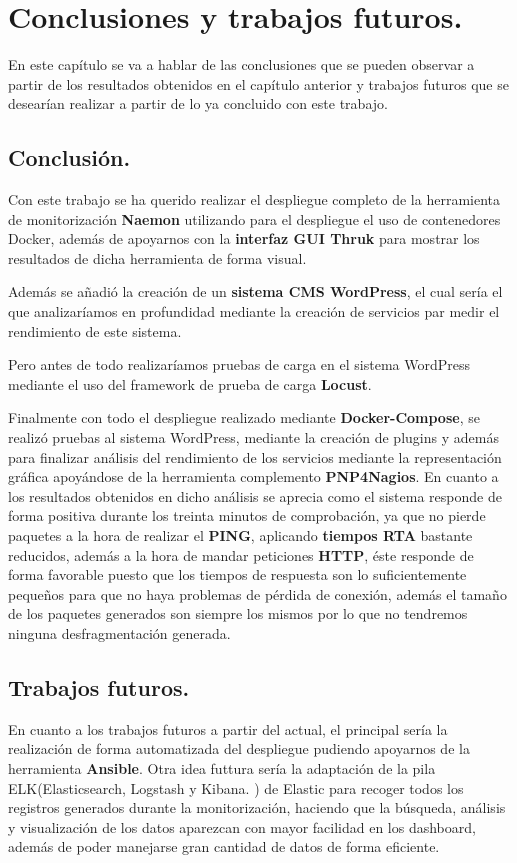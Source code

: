 \chapter{Conclusiones y trabajos futuros.} \label{ch:conclusion}

En este capítulo se va a hablar de las conclusiones que se pueden observar a partir de los resultados obtenidos en el capítulo anterior y trabajos futuros que se desearían realizar a partir de lo ya concluido con este trabajo.
\section{Conclusión.} \label{sec:resultado_final.}
Con este trabajo se ha querido realizar el despliegue completo de la herramienta de monitorización \textbf{Naemon} utilizando para el despliegue el uso de contenedores Docker, además de apoyarnos con la \textbf{interfaz GUI Thruk} para mostrar los resultados de dicha herramienta de forma visual.

Además se añadió la creación de un \textbf{sistema CMS WordPress}, el cual sería el que analizaríamos en profundidad mediante la creación de servicios par medir el rendimiento de este sistema.

Pero antes de todo realizaríamos pruebas de carga en el sistema WordPress mediante el uso del framework de prueba de carga \textbf{Locust}.

Finalmente con todo el despliegue realizado mediante \textbf{Docker-Compose}, se realizó pruebas al sistema WordPress, mediante la creación de plugins y además para finalizar análisis del rendimiento de los servicios mediante la representación gráfica apoyándose de la herramienta complemento \textbf{PNP4Nagios}.
\newpage
En cuanto a los resultados obtenidos en dicho análisis se aprecia como el sistema responde de forma positiva durante los treinta minutos de comprobación, ya que no pierde paquetes a la hora de realizar el \textbf{PING}, aplicando \textbf{tiempos RTA} bastante reducidos, además a la hora de mandar peticiones \textbf{HTTP}, éste responde de forma favorable puesto que los tiempos de respuesta son lo suficientemente pequeños para que no haya problemas de pérdida de conexión, además el tamaño de los paquetes generados son siempre los mismos por lo que no tendremos ninguna desfragmentación generada.

\section{Trabajos futuros.} \label{sec:trabajos_futuros.}

En cuanto a los trabajos futuros a partir del actual, el principal sería la realización de forma automatizada del despliegue pudiendo apoyarnos de la herramienta \textbf{Ansible}.
Otra idea futtura sería la adaptación de la pila ELK(Elasticsearch, Logstash y Kibana. ) de Elastic para recoger todos los registros generados durante la monitorización, haciendo que la búsqueda, análisis y visualización de los datos aparezcan con mayor facilidad en los dashboard, además de poder manejarse gran cantidad de datos de forma eficiente.
\newpage